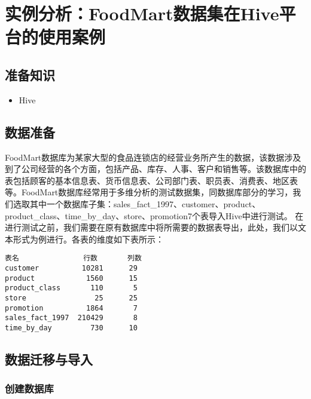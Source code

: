 \section{实例分析：FoodMart数据集在Hive平台的使用案例}\label{ux5b9eux4f8bux5206ux6790foodmartux6570ux636eux96c6ux5728hiveux5e73ux53f0ux7684ux4f7fux7528ux6848ux4f8b}

\subsection{准备知识}\label{ux51c6ux5907ux77e5ux8bc6}

\begin{itemize}
\itemsep1pt\parskip0pt
\item
  Hive
\end{itemize}

\subsection{数据准备}\label{ux6570ux636eux51c6ux5907}

FoodMart数据库为某家大型的食品连锁店的经营业务所产生的数据，该数据涉及到了公司经营的各个方面，包括产品、库存、人事、客户和销售等。该数据库中的表包括顾客的基本信息表、货币信息表、公司部门表、职员表、消费表、地区表等。FoodMart数据库经常用于多维分析的测试数据集，同数据库部分的学习，我们选取其中一个数据库子集：sales\_fact\_1997、customer、product、product\_class、time\_by\_day、store、promotion7个表导入Hive中进行测试。
在进行测试之前，我们需要在原有数据库中将所需要的数据表导出，此处，我们以文本形式为例进行。各表的维度如下表所示：

\begin{lstlisting}
表名               行数       列数
customer          10281      29
product            1560      15
product_class       110       5
store                25      25
promotion          1864       7
sales_fact_1997  210429       8
time_by_day         730      10
\end{lstlisting}

\subsection{数据迁移与导入}\label{ux6570ux636eux8fc1ux79fbux4e0eux5bfcux5165}

\subsubsection{创建数据库}\label{ux521bux5efaux6570ux636eux5e93}

